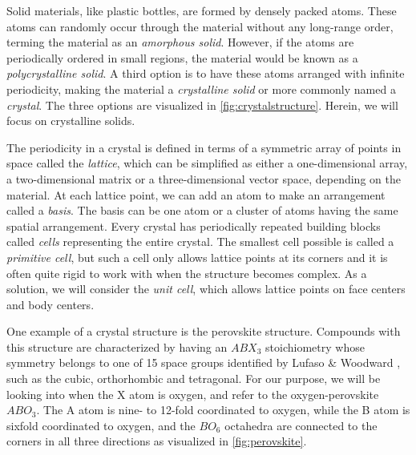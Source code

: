 

Solid materials, like plastic bottles, are formed by densely packed atoms. These atoms can randomly occur through the material without any long-range order, terming the material as an \textit{amorphous solid}. However, if the atoms are periodically ordered in small regions, the material would be known as a \textit{polycrystalline solid}. %
A third option is to have these atoms arranged with infinite periodicity, making the material a \textit{crystalline solid} or more commonly named a \textit{crystal}. The three options are visualized in \autoref{fig:crystalstructure}. Herein, we will focus on crystalline solids.

The periodicity in a crystal is defined in terms of a symmetric array of points in space called the \textit{lattice}, which can be simplified as either a one-dimensional array, a two-dimensional matrix or a three-dimensional vector space, depending on the material. At each lattice point, we can add an atom to make an arrangement called a \textit{basis}. The basis can be one atom or a cluster of atoms having the same spatial arrangement. Every crystal has periodically repeated building blocks called \textit{cells} representing the entire crystal. The smallest cell possible is called a \textit{primitive cell}, but such a cell only allows lattice points at its corners and it is often quite rigid to work with when the structure becomes complex. As a solution, we will consider the \textit{unit cell}, which allows lattice points on face centers and body centers.

One example of a crystal structure is the perovskite structure. Compounds with this structure are characterized by having an $ABX_3$ stoichiometry whose symmetry belongs to one of 15 space groups identified by Lufaso \& Woodward \cite{Lufaso2001}, such as the cubic, orthorhombic and tetragonal. For our purpose, we will be looking into when the X atom is oxygen, and refer to the oxygen-perovskite $ABO_3$. The A atom is nine- to 12-fold coordinated to oxygen, while the B atom is sixfold coordinated to oxygen, and the $BO_6$ octahedra are connected to the corners in all three directions as visualized in \autoref{fig:perovskite}.

